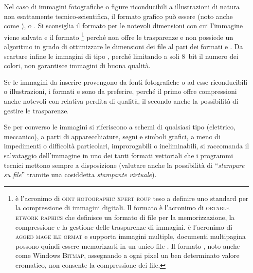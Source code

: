 Nel caso di immagini fotografiche o figure riconducibili a illustrazioni di natura non esattamente tecnico-scientifica, il formato grafico può essere  (noto anche come ), o . Si sconsiglia il formato  per le notevoli dimensioni con cui l'immagine viene salvata e il formato %
\footnote{ è l'acronimo di \textsc{oint hotographic xpert roup} teso a definire uno standard per la compressione di immagini digitali. Il formato  è l'acronimo di \textsc{ortable etwork 
raphics} che definisce un formato di file per la memorizzazione, la compressione e la gestione delle trasparenze di immagini.  è l'acronimo di \textsc{agged mage ile ormat} e supporta immagini multiple, documenti multipagina possono quindi essere memorizzati in un unico file . Il formato , noto anche come Windows \textsc{Bitmap}, assegnando a ogni pixel un ben determinato valore cromatico, non consente la compressione dei file.}
perché non offre le trasparenze e non possiede un algoritmo in grado di ottimizzare le dimensioni dei file al pari dei formati  e . Da scartare infine le immagini di tipo , perché limitando a soli $8$~bit il numero dei colori, non garantisce immagini di buona qualità.

Se le immagini da inserire provengono da fonti fotografiche o ad esse riconducibili o illustrazioni, i formati  e  sono da preferire, perché il primo offre compressioni anche notevoli con relativa perdita di qualità, il secondo anche la possibilità di gestire le trasparenze.

Se per converso le immagini si riferiscono a schemi di qualsiasi tipo (elettrico, meccanico), a parti di apparecchiature, segni e simboli grafici, a meno di impedimenti o difficoltà particolari, improrogabili o ineliminabili, si raccomanda il salvataggio dell'immagine in uno dei tanti formati vettoriali che i programmi tecnici mettono sempre a disposizione (valutare anche la possibilità di ``\textit{stampare su file}'' tramite una cosiddetta \textit{stampante virtuale}).

